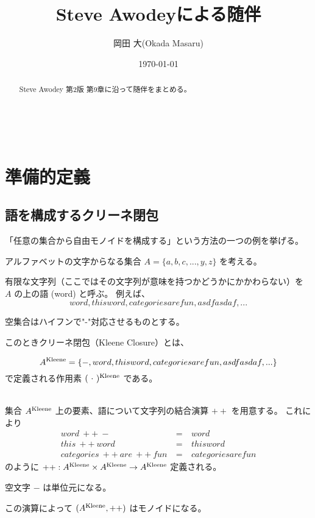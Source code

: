 \documentclass[uplatex,a4j,12pt,dvipdfmx]{jsarticle}
\title{
Steve Awodeyによる随伴
}
\author{岡田 大(Okada Masaru)}
\date{\today}
\begin{document}
\maketitle

\begin{abstract}
	Steve Awodey 第2版 第9章に沿って随伴をまとめる\cite{Awodey}。
\end{abstract}

\tableofcontents

\ \\

\section{準備的定義}

\subsection{語を構成するクリーネ閉包}

「任意の集合から自由モノイドを構成する」という方法の一つの例を挙げる。

アルファベットの文字からなる集合 $A = \{ a,b,c,...,y,z \}$ を考える。

有限な文字列（ここではその文字列が意味を持つかどうかにかかわらない）を $A$ の上の語 (word) と呼ぶ。
例えば、
$$
	word, thisword, categoriesarefun, asdfasdaf, ...
$$

空集合はハイフンで"-"対応させるものとする。

このときクリーネ閉包（Kleene Closure）とは、

$$
	A^{\rm Kleene} = \{ -, word, thisword, categoriesarefun, asdfasdaf, ... \}
$$
で定義される作用素 $( \ \cdot \ )^{\rm Kleene}$ である。

\ \\

集合 $A^{\rm Kleene}$ 上の要素、語について文字列の結合演算 $++$ を用意する。
これにより
\[
	\begin{array}{rcl}
		word \ ++ \ - \                     & = & \ word             \\
		this \ ++ \ word \                  & = & \ thisword         \\
		categories \ ++ \ are \ ++ \ fun \  & = & \ categoriesarefun
	\end{array}
\]
のように $++ : A^{\rm Kleene} \times A^{\rm Kleene} \to A^{\rm Kleene}$ 定義される。

空文字 $-$ は単位元になる。

この演算によって $(A^{\rm Kleene}, ++)$ はモノイドになる。
\end{document}
